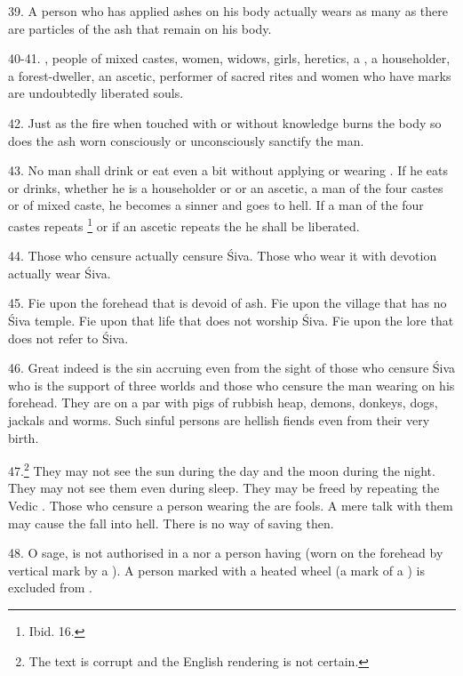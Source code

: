 39. A person who has applied ashes on his body actually wears as many 
as there are particles of the ash that remain on his body.

40-41. , people of mixed castes, women,
widows, girls, heretics, a , a householder, a forest-dweller,
an ascetic, performer of sacred rites and women who have  marks
are undoubtedly liberated souls.

42. Just as the fire when touched with or without knowledge burns the body so
does the ash worn consciously or unconsciously sanctify the man.

43. No man shall drink or eat even a bit without applying  or wearing
. If he eats or drinks, whether he is a householder or
 or an ascetic, a man of the four castes or of mixed caste, he
becomes a sinner and goes to hell. If a man of the four castes repeats
\footnote{Ibid. 16.} or if an ascetic repeats the  he
shall be liberated.

44. Those who censure  actually censure Śiva. Those who wear it
with devotion actually wear Śiva.

45. Fie upon the forehead that is devoid of ash. Fie upon the village that has
no Śiva temple. Fie upon that life that does not worship Śiva. Fie upon the lore
that does not refer to Śiva.

46. Great indeed is the sin accruing even from the sight of those who censure
Śiva who is the support of three worlds and those who censure the man wearing
 on his forehead. They are on a par with pigs of rubbish heap,
demons, donkeys, dogs, jackals and worms. Such sinful persons are hellish fiends
even from their very birth.

47.\footnote{The text is corrupt and the English rendering is not certain.} They
may not see the sun during the day and the moon during the night. They may not
see them even during sleep. They may be freed by repeating the Vedic
. Those who censure a person wearing the  are
fools. A mere talk with them may cause the fall into hell. There is no way of
saving then.

48. O sage,  is not authorised in a  nor a person
having  (worn on the forehead by vertical mark by
a ). A person marked with a heated wheel (a mark of
a ) is excluded from .

